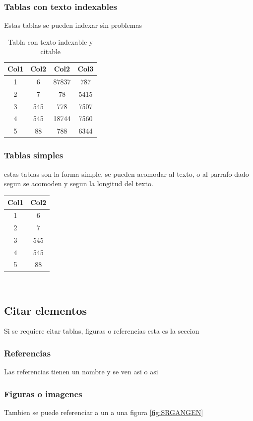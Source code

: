 \documentclass[journal]{IEEEtran}
\begin{document}
\subsubsection{Tablas con texto indexables}
Estas tablas se pueden indexar sin problemas
\begin{table}[h!]
    \centering
    \begin{tabular}{||c c c c||} 
     \hline
     Col1 & Col2 & Col2 & Col3 \\ [0.5ex] 
     \hline
     1 & 6 & 87837 & 787 \\ 
     2 & 7 & 78 & 5415 \\
     3 & 545 & 778 & 7507 \\
     4 & 545 & 18744 & 7560 \\
     5 & 88 & 788 & 6344 \\ [1ex] 
     \hline
    \end{tabular}
    \caption{Tabla con texto indexable y citable}
    \label{tabla:1}
    \end{table}
\subsubsection{Tablas simples}
estas tablas son la forma simple, se pueden acomodar al texto,
o al parrafo dado segun se acomoden y segun la longitud del texto.

\begin{tabular}{||c c||} 
    \hline
    Col1 & Col2 \\ [0.5ex] 
    \hline
    1 & 6  \\ 
    2 & 7 \\
    3 & 545 \\
    4 & 545 \\
    5 & 88  \\ [1ex] 
    \hline
\end{tabular}
\\
\subsection{Citar elementos}
Si se requiere citar tablas, figuras o referencias esta es la seccion
\subsubsection{Referencias}
Las referencias tienen un nombre y se ven asi \cite{ledig} o asi \cite[Trabajo de ledig]{ledig}
\subsubsection{Figuras o imagenes}
Tambien se puede referenciar a un a una figura \ref{fig:SRGANGEN}
\end{document}

